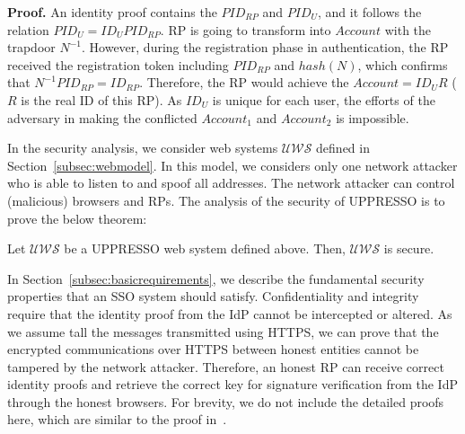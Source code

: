 \noindent\textbf{Proof. }An identity proof contains the $PID_{RP}$ and $PID_{U}$, and it follows the relation $PID_U=ID_UPID_{RP}$. RP is going to transform into $Account$ with the trapdoor $N^{-1}$. However, during the registration phase in authentication, the RP received the registration token including $PID_{RP}$ and $hash(N)$, which confirms that $N^{-1}PID_{RP}=ID_{RP}$. Therefore, the RP would achieve the $Account=ID_UR$ ($R$ is the real ID of this RP). As $ID_U$ is unique for each user, the efforts of the adversary in making the conflicted $Account_1$ and $Account_2$ is impossible.

In the security analysis, we consider web systems $\mathcal{UWS}$ defined in Section~\ref{subsec:webmodel}. In this model, we considers only
one network attacker who is able to listen to and spoof all addresses. The network attacker can control (malicious) browsers and RPs.
The analysis of the security of UPPRESSO is to prove the below theorem:
\begin{theorem}
Let $\mathcal{UWS}$ be a UPPRESSO web system defined above. Then, $\mathcal{UWS}$ is secure.
\label{the:secure}
\end{theorem}
\vspace{-\topsep}
In Section~\ref{subsec:basicrequirements}, we describe the fundamental security properties that an SSO system should satisfy. Confidentiality and integrity require that the identity proof from the IdP cannot be intercepted or altered. As we assume tall the messages transmitted using HTTPS, we can prove that the encrypted communications over HTTPS between honest entities cannot be tampered by the network attacker. Therefore, an honest RP can receive correct identity proofs and retrieve the correct key for signature verification from the IdP through the honest browsers. For brevity, we do not include the detailed proofs here, which are similar to the proof in~\cite{SPRESSO}.

